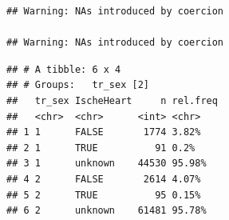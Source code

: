 \documentclass[]{article}
\newenvironment{Shaded}{\begin{snugshade}}{\end{snugshade}}
\newcommand{\DataTypeTok}[1]{\textcolor[rgb]{0.13,0.29,0.53}{#1}}
\newcommand{\DecValTok}[1]{\textcolor[rgb]{0.00,0.00,0.81}{#1}}
\newcommand{\KeywordTok}[1]{\textcolor[rgb]{0.13,0.29,0.53}{\textbf{#1}}}
\newcommand{\NormalTok}[1]{#1}
\newcommand{\OperatorTok}[1]{\textcolor[rgb]{0.81,0.36,0.00}{\textbf{#1}}}
\newcommand{\OtherTok}[1]{\textcolor[rgb]{0.56,0.35,0.01}{#1}}
\newcommand{\StringTok}[1]{\textcolor[rgb]{0.31,0.60,0.02}{#1}}
\begin{document}
\begin{verbatim}
## Warning: NAs introduced by coercion

## Warning: NAs introduced by coercion
\end{verbatim}

\begin{Shaded}
\end{Shaded}

\begin{verbatim}
## # A tibble: 6 x 4
## # Groups:   tr_sex [2]
##   tr_sex IscheHeart     n rel.freq
##   <chr>  <chr>      <int> <chr>   
## 1 1      FALSE       1774 3.82%   
## 2 1      TRUE          91 0.2%    
## 3 1      unknown    44530 95.98%  
## 4 2      FALSE       2614 4.07%   
## 5 2      TRUE          95 0.15%   
## 6 2      unknown    61481 95.78%
\end{verbatim}

\begin{Shaded}
\end{Shaded}
\end{document}
